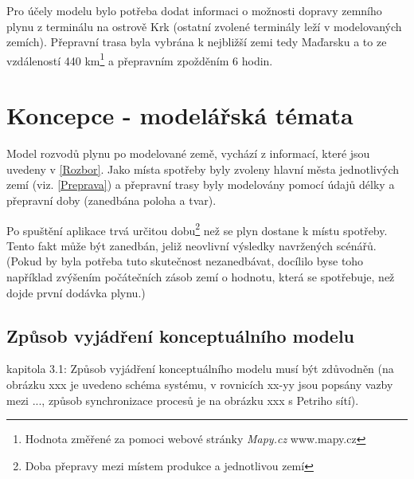 \documentclass[a4paper,11pt]{article}
\begin{document}
Pro účely modelu bylo potřeba dodat informaci o možnosti dopravy zemního plynu
z terminálu na ostrově Krk (ostatní zvolené terminály leží v modelovaných zemích).
Přepravní trasa byla vybrána k nejbližší zemi tedy Maďarsku a to ze vzdáleností 
440 km\footnote{Hodnota změřené za pomoci webové stránky \textit{Mapy.cz} www.mapy.cz} a přepravním zpožděním 6 hodin.



\section{Koncepce - modelářská témata}

Model rozvodů plynu po modelované země, vychází z informací, které jsou uvedeny v \ref{Rozbor}. Jako místa spotřeby byly zvoleny hlavní města jednotlivých zemí (viz. \ref{Preprava}) a přepravní trasy byly modelovány pomocí údajů délky a přepravní doby (zanedbána poloha a tvar). 

Po spuštění aplikace trvá určitou dobu\footnote{Doba přepravy mezi místem produkce a jednotlivou zemí} než se plyn dostane k místu spotřeby. Tento fakt může být zanedbán, jeliž neovlivní výsledky navržených scénářů. (Pokud by byla potřeba tuto skutečnost nezanedbávat, docílilo byse toho například zvýšením počátečních zásob zemí o hodnotu, která se spotřebuje, než dojde první dodávka plynu.) 

\subsection{Způsob vyjádření konceptuálního modelu}
kapitola 3.1: Způsob vyjádření konceptuálního modelu musí být zdůvodněn (na obrázku xxx je uvedeno schéma systému, v rovnicích xx-yy jsou popsány vazby mezi ..., způsob synchronizace procesů je na obrázku xxx s Petriho sítí).
\end{document}
